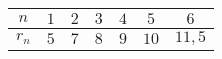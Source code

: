 \begin{tabular}{| c | c | c | c | c | c | c |}
\hline
$n$ & $1$ & $2$ & $3$ & $4$ & $5$ & $6$\\
\hline
$r_n$ & $5$ & $7$ & $8$ & $9$ & $10$ & $11,5$\\
\hline
\end{tabular}
